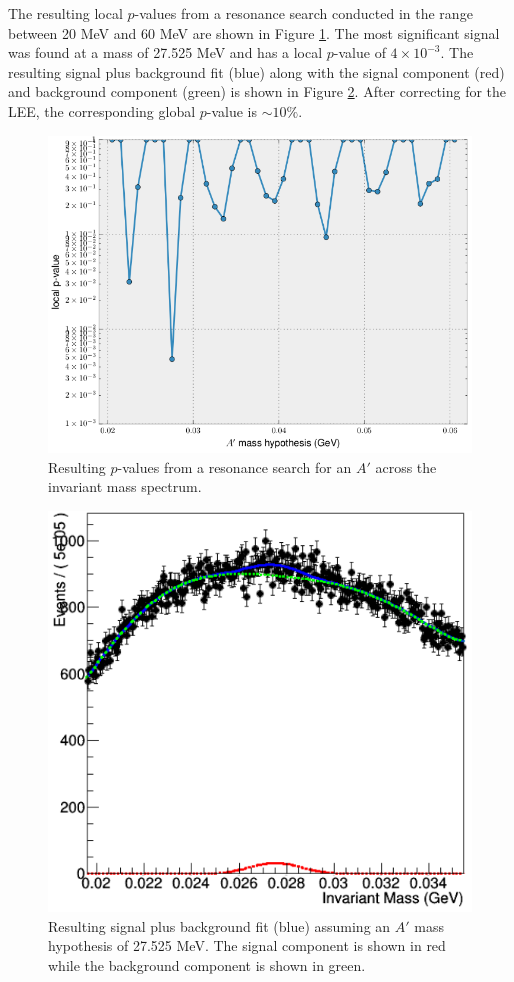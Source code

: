 The resulting local $p$-values from a resonance search conducted in the range 
between 20 MeV and 60 MeV are shown in Figure \ref{fig:local_p_values}. 
The most significant signal
was found at a mass of 27.525 MeV and has a local $p$-value of $4 \times 10^{-3}$.
The resulting signal plus background fit (blue) along with the signal component 
(red) and background component (green) is shown in Figure \ref{fig:fit_27}.
After correcting for the LEE, the corresponding global $p$-value is 
$\sim 10\%$.
\begin{figure}[t]
    \centering
    \includegraphics[width=\textwidth]{images/final_p_values.png}
    \caption{Resulting $p$-values from a resonance search for an $A'$ across the
    invariant mass spectrum.}
    \label{fig:local_p_values}
\end{figure}

\begin{figure}[ht]
    \centering
    \includegraphics[width=.6\textwidth]{images/fit27.png}
    \caption{Resulting signal plus background fit (blue) assuming an $A'$ mass hypothesis
             of 27.525 MeV.  The signal component is shown in red while the 
         background component is shown in green.}
    \label{fig:fit_27}
\end{figure}

